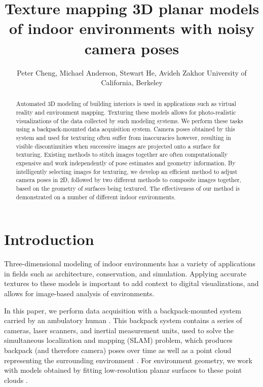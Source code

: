\documentclass[]{spie}  %
\title{Texture mapping 3D planar models of indoor environments with noisy camera poses}
\author{Peter Cheng, Michael Anderson, Stewart He, Avideh Zakhor
\skiplinehalf
University of California, Berkeley\\
}
\begin{document}
\maketitle

\begin{abstract}
  Automated 3D modeling of building interiors is used in applications
  such as virtual reality and environment mapping. Texturing these
  models allows for photo-realistic visualizations of the data
  collected by such modeling systems. We perform these tasks using a
  backpack-mounted data acquisition system. Camera poses obtained by
  this system and used for texturing often suffer from inaccuracies
  however, resulting in visible discontinuities when successive images
  are projected onto a surface for texturing. Existing methods to
  stitch images together are often computationally expensive and work
  independently of pose estimates and geometry information. By
  intelligently selecting images for texturing, we develop
  an efficient method to adjust camera poses in 2D, followed by two
  different methods to composite images together, based on the
  geometry of surfaces being textured. The effectiveness of our
  method is demonstrated on a number of different indoor
  environments.
\end{abstract}



\section{Introduction}
\label{sec:introduction} %
Three-dimensional modeling of indoor environments has a variety of
applications in fields such as architecture, conservation, and
simulation. Applying accurate textures to these models is important to
add context to digital visualizations, and allows for image-based
analysis of environments.

In this paper, we perform data acquisition with a backpack-mounted
system carried by an ambulatory human \cite{liu2010indoor}. This
backpack system contains a series of cameras, laser scanners, and
inertial measurement units, used to solve the simultaneous
localization and mapping (SLAM) problem, which produces backpack (and
therefore camera) poses over time as well as a point cloud
representing the surrounding environment \cite{chen2010indoor,
  liu2010indoor, kua2012loopclosure}. For environment geometry, we
work with models obtained by fitting low-resolution planar surfaces to
these point clouds \cite{sanchez2012point}.
\end{document}
